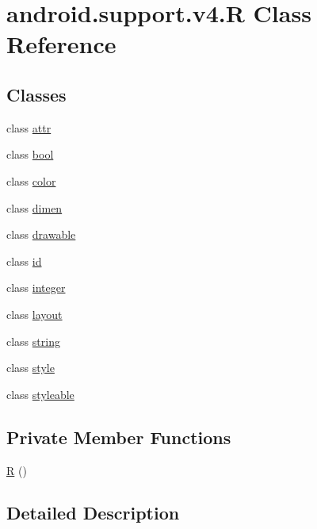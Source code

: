 \hypertarget{classandroid_1_1support_1_1v4_1_1_r}{}\section{android.\+support.\+v4.\+R Class Reference}
\label{classandroid_1_1support_1_1v4_1_1_r}
\subsection*{Classes}
\begin{DoxyCompactItemize}
\item 
class \mbox{\hyperlink{classandroid_1_1support_1_1v4_1_1_r_1_1attr}{attr}}
\item 
class \mbox{\hyperlink{classandroid_1_1support_1_1v4_1_1_r_1_1bool}{bool}}
\item 
class \mbox{\hyperlink{classandroid_1_1support_1_1v4_1_1_r_1_1color}{color}}
\item 
class \mbox{\hyperlink{classandroid_1_1support_1_1v4_1_1_r_1_1dimen}{dimen}}
\item 
class \mbox{\hyperlink{classandroid_1_1support_1_1v4_1_1_r_1_1drawable}{drawable}}
\item 
class \mbox{\hyperlink{classandroid_1_1support_1_1v4_1_1_r_1_1id}{id}}
\item 
class \mbox{\hyperlink{classandroid_1_1support_1_1v4_1_1_r_1_1integer}{integer}}
\item 
class \mbox{\hyperlink{classandroid_1_1support_1_1v4_1_1_r_1_1layout}{layout}}
\item 
class \mbox{\hyperlink{classandroid_1_1support_1_1v4_1_1_r_1_1string}{string}}
\item 
class \mbox{\hyperlink{classandroid_1_1support_1_1v4_1_1_r_1_1style}{style}}
\item 
class \mbox{\hyperlink{classandroid_1_1support_1_1v4_1_1_r_1_1styleable}{styleable}}
\end{DoxyCompactItemize}
\subsection*{Private Member Functions}
\begin{DoxyCompactItemize}
\item 
\mbox{\hyperlink{classandroid_1_1support_1_1v4_1_1_r_a254130e1af6c1572edc11c48990a7e01}{R}} ()
\end{DoxyCompactItemize}


\subsection{Detailed Description}


